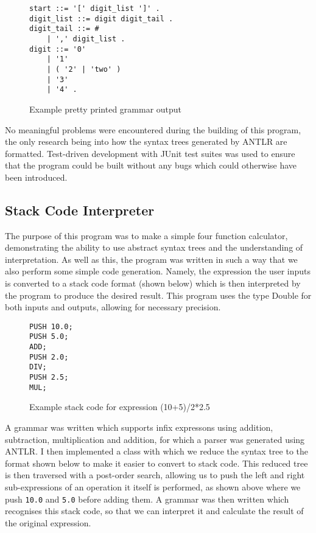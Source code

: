 \documentclass[a4paper, 11pt]{article}
\begin{document}
\begin{figure}[H]
\centering
\begin{BVerbatim}
start ::= '[' digit_list ']' .
digit_list ::= digit digit_tail . 
digit_tail ::= # 
	| ',' digit_list . 
digit ::= '0' 
	| '1' 
	| ( '2' | 'two' ) 
	| '3' 
	| '4' .
\end{BVerbatim}
\caption{Example pretty printed grammar output}
\end{figure}

\noindent No meaningful problems were encountered during the building of this program, the only research being into how the syntax trees generated by ANTLR are formatted. Test-driven development with JUnit test suites was used to ensure that the program could be built without any bugs which could otherwise have been introduced.

\subsection{Stack Code Interpreter}
The purpose of this program was to make a simple four function calculator, demonstrating the ability to use abstract syntax trees and the understanding of interpretation. As well as this, the program was written in such a way that we also perform some simple code generation. Namely, the expression the user inputs is converted to a stack code format (shown below) which is then interpreted by the program to produce the desired result. This program uses the type Double for both inputs and outputs, allowing for necessary precision.

\begin{figure}[H]
\centering
\begin{BVerbatim}
PUSH 10.0;
PUSH 5.0;
ADD;
PUSH 2.0;
DIV;
PUSH 2.5;
MUL;
\end{BVerbatim}
\caption{Example stack code for expression (10+5)/2*2.5}
\end{figure}

\noindent A grammar was written which supports infix expressons using addition, subtraction, multiplication and addition, for which a parser was generated using ANTLR. I then implemented a class with which we reduce the syntax tree to the format shown below to make it easier to convert to stack code. This reduced tree is then traversed with a post-order search, allowing us to push the left and right sub-expressions of an operation it itself is performed, as shown above where we push \texttt{10.0} and \texttt{5.0} before adding them. A grammar was then written which recognises this stack code, so that we can interpret it and calculate the result of the original expression. 
\end{document}
